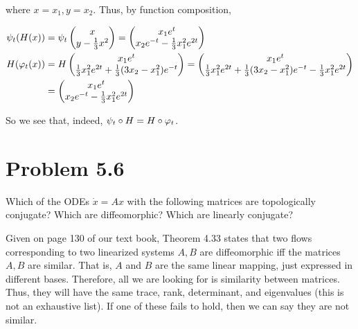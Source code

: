 \begin{solution}
    where $x = x_1, y = x_2$. Thus, by function composition, 

    \alignbreak
    \begin{align}
        \psi_t(H(x)) &= \psi_t \begin{pmatrix} x\\ y - \frac{1}{3}x^2\end{pmatrix}\nonumber =  \begin{pmatrix}x_1e^t\\ x_2e^{-t} - \frac{1}{3}x_1^2e^{2t}\end{pmatrix}\nonumber\\
        H(\varphi_t(x)) &= H\begin{pmatrix}x_1e^t\\\frac{1}{3}x_1^2e^{2t} + \frac{1}{3}(3x_2 - x_1^2)e^{-t}\end{pmatrix} = \begin{pmatrix} x_1e^t\\ \frac{1}{3}x_1^2e^{2t} + \frac{1}{3}(3x_2 - x_1^2)e^{-t} - \frac{1}{3}x_1^2e^{2t}\end{pmatrix}\nonumber\\
        &= \begin{pmatrix}x_1e^t\\ x_2e^{-t} - \frac{1}{3}x_1^2e^{2t}\end{pmatrix}\nonumber
    \end{align}
    \alignbreak

    So we see that, indeed, $\psi_t \circ H = H \circ \varphi_t$.
\end{solution}

\newpage
\section{Problem 5.6}
Which of the ODEs $\dot{x} = Ax$ with the following matrices are topologically conjugate? Which are diffeomorphic? Which are linearly conjugate?

\partbreak
\begin{solution}

    Given on page 130 of our text book, Theorem 4.33 states that two flows corresponding to two linearized systems $A, B$ are diffeomorphic iff the matrices $A, B$ are similar. That is, $A$ and $B$ are the same linear mapping, just expressed in different bases. Therefore, all we are looking for is similarity between matrices. Thus, they will have the same trace, rank, determinant, and eigenvalues (this is not an exhaustive list). If one of these fails to hold, then we can say they are not similar.  
\end{solution}
\newpage
